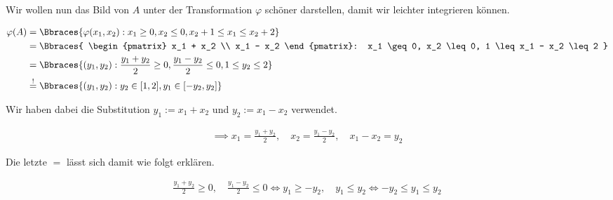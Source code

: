\begin{solution}
\begin{enumerate}[label = \arabic*.]
    Wir wollen nun das Bild von $A$ unter der Transformation $\varphi$ schöner darstellen, damit wir leichter integrieren können.

    \begin{align*}
        \varphi(A)
        & =
        \Bbraces
        {
            \varphi(x_1, x_2):
            x_1 \geq 0,
            x_2 \leq 0,
            x_2 + 1 \leq x_1 \leq x_2 + 2} \\
        & =
        \Bbraces
        {
            \begin{pmatrix}
                x_1 + x_2 \\ x_1 - x_2
            \end{pmatrix}:
            x_1 \geq 0,
            x_2 \leq 0,
            1 \leq x_1 - x_2 \leq 2
        } \\
        & =
        \Bbraces
        {
            (y_1, y_2):
            \frac{y_1 + y_2}{2} \geq 0,
            \frac{y_1 - y_2}{2} \leq 0,
            1 \leq y_2 \leq 2
        } \\
        & \stackrel{!}{=}
        \Bbraces
        {
            (y_1, y_2):
            y_2 \in [1, 2],
            y_1 \in [-y_2, y_2]
        } \\
    \end{align*}

    Wir haben dabei die Substitution $y_1 := x_1 + x_2$ und $y_2 := x_1 - x_2$ verwendet.

    \begin{align*}
        \implies
        x_1 = \frac{y_1 + y_2}{2},
        \quad
        x_2 = \frac{y_1 - y_2}{2},
        \quad
        x_1 - x_2 = y_2
    \end{align*}

    Die letzte $=$ lässt sich damit wie folgt erklären.

    \begin{align*}
        \frac{y_1 + y_2}{2} \geq 0,
        \quad
        \frac{y_1 - y_2}{2} \leq 0
        \iff
        y_1 \geq -y_2,
        \quad
        y_1 \leq y_2
        \iff
        -y_2 \leq y_1 \leq y_2
    \end{align*}


\end{enumerate}
\end{solution}
